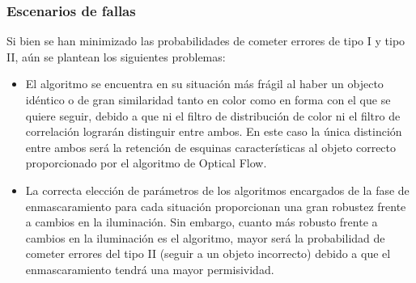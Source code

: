 




































\subsubsection{Escenarios de fallas}
Si bien se han minimizado las probabilidades de cometer errores de tipo I y tipo II, aún se plantean los siguientes problemas:
\begin{itemize}
\item El algoritmo se encuentra en su situación más frágil al haber un objecto idéntico o de gran similaridad tanto en color como en forma con el que se quiere seguir, debido a que ni el filtro de distribución de color ni el filtro de correlación lograrán distinguir entre ambos. En este caso la única distinción entre ambos será la retención de esquinas características al objeto correcto proporcionado por el algoritmo de Optical Flow. 
\item La correcta elección de parámetros de los algoritmos encargados de la fase de enmascaramiento para cada situación proporcionan una gran robustez frente a cambios en la iluminación. Sin embargo, cuanto más robusto frente a cambios en la iluminación es el algoritmo, mayor será la probabilidad de cometer errores del tipo II (seguir a un objeto incorrecto) debido a que el enmascaramiento tendrá una mayor permisividad. 
\end{itemize}



